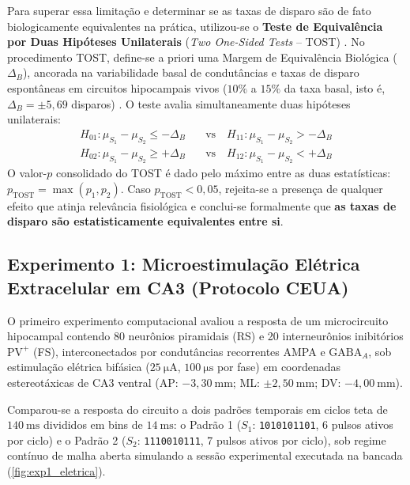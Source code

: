 \documentclass[11pt,a4paper,article,brazil]{abntex2}
\begin{document}
Para superar essa limitação e determinar se as taxas de disparo são de fato biologicamente equivalentes na prática, utilizou-se o \textbf{Teste de Equivalência por Duas Hipóteses Unilaterais} (\emph{Two One-Sided Tests} -- TOST) \cite{schuirmann1987, lakens2017}. No procedimento TOST, define-se a priori uma Margem de Equivalência Biológica ($\Delta_B$), ancorada na variabilidade basal de condutâncias e taxas de disparo espontâneas em circuitos hipocampais vivos ($10\%$ a $15\%$ da taxa basal, isto é, $\Delta_B = \pm 5{,}69$ disparos) \cite{buzsaki2006, gerstner2014}. O teste avalia simultaneamente duas hipóteses unilaterais:
\begin{align}
    H_{01}: \mu_{S_1} - \mu_{S_2} \le -\Delta_B \quad & \text{vs} \quad H_{11}: \mu_{S_1} - \mu_{S_2} > -\Delta_B \\
    H_{02}: \mu_{S_1} - \mu_{S_2} \ge +\Delta_B \quad & \text{vs} \quad H_{12}: \mu_{S_1} - \mu_{S_2} < +\Delta_B
\end{align}
O valor-$p$ consolidado do TOST é dado pelo máximo entre as duas estatísticas: $p_{\text{TOST}} = \max(p_1, p_2)$. Caso $p_{\text{TOST}} < 0{,}05$, rejeita-se a presença de qualquer efeito que atinja relevância fisiológica e conclui-se formalmente que \textbf{as taxas de disparo são estatisticamente equivalentes entre si}.

\subsection{Experimento 1: Microestimulação Elétrica Extracelular em CA3 (Protocolo CEUA)}

O primeiro experimento computacional avaliou a resposta de um microcircuito hipocampal contendo 80 neurônios piramidais (RS) e 20 interneurônios inibitórios $\text{PV}^+$ (FS), interconectados por condutâncias recorrentes AMPA e $\text{GABA}_A$, sob estimulação elétrica bifásica ($\qty{25}{\micro\ampere}$, $\qty{100}{\micro\second}$ por fase) em coordenadas estereotáxicas de CA3 ventral (AP: $-3{,}30\ \text{mm}$; ML: $\pm 2{,}50\ \text{mm}$; DV: $-4{,}00\ \text{mm}$).

Comparou-se a resposta do circuito a dois padrões temporais em ciclos teta de $\qty{140}{\milli\second}$ divididos em bins de $\qty{14}{\milli\second}$: o Padrão 1 ($S_1$: \texttt{1010101101}, 6 pulsos ativos por ciclo) e o Padrão 2 ($S_2$: \texttt{1110010111}, 7 pulsos ativos por ciclo), sob regime contínuo de malha aberta simulando a sessão experimental executada na bancada (\cref{fig:exp1_eletrica}).
\end{document}
